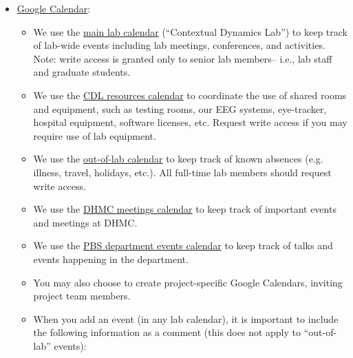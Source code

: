 \documentclass{tufte-book} %
\begin{document}
\begin{itemize}
\item \href{http://calendar.google.com}{Google Calendar}:
  \begin{itemize}
  \item We use the
    \href{https://calendar.google.com/calendar/embed?src=5ta50cfv4uih0a0k8m2di9dhjo%40group.calendar.google.com&ctz=America%2FNew_York}{main
      lab calendar} (``Contextual Dynamics Lab'') to keep track of lab-wide events including lab
    meetings, conferences, and activities.  Note: write access is
    granted only to senior lab members-- i.e., lab staff and graduate students.
  \item We use the
    \href{https://calendar.google.com/calendar/embed?src=dgcv8l8a8s10hfg2s5h0qec0q0%40group.calendar.google.com&ctz=America%2FNew_York}{CDL
      resources calendar} to coordinate the use of shared rooms and
    equipment, such as testing rooms, our EEG systems, eye-tracker,
    hospital equipment, software licenses, etc.  Request write access
    if you may require use of lab equipment.
  \item We use the
    \href{https://calendar.google.com/calendar/embed?src=h1j06dohcg7v1g2o5tkb7ijhvs%40group.calendar.google.com&ctz=America%2FNew_York}{out-of-lab
      calendar} to keep track of known absences (e.g. illness, travel,
    holidays, etc.).    All
    full-time lab members should request write access.
  \item We use the \href{https://calendar.google.com/calendar/embed?src=j6noo2tqahpsoq9na1h16paf3s%40group.calendar.google.com&ctz=America%2FNew_York}{DHMC meetings
  calendar} to keep track of important events and meetings at DHMC.
  \item We use the \href{https://calendar.google.com/calendar/embed?src=c_31ckainhaqlmhk4hkc633fs9ho%40group.calendar.google.com&ctz=America%2FNew_York}{PBS department events calendar} to keep track of talks and events happening in the department.
  \item You may also choose to create project-specific Google
    Calendars, inviting project team members.
  \item When you add an event (in any lab calendar), it is important
    to include the following information as a comment (this does not
    apply to ``out-of-lab'' events):
\begin{itemize}

\end{itemize}
\end{itemize}
\end{itemize}
\end{document}
